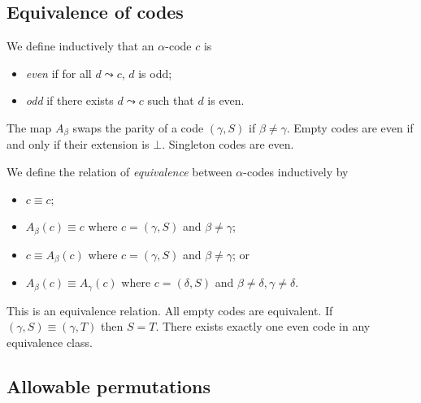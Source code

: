 \documentclass{article}
\begin{document}
\subsection{Equivalence of codes}

\begin{definition}
    We define inductively that an \( \alpha \)-code \( c \) is
    \begin{itemize}
        \item \emph{even} if for all \( d \leadsto c \), \( d \) is odd;
        \item \emph{odd} if there exists \( d \leadsto c \) such that \( d \) is even.
    \end{itemize}
\end{definition}
\begin{lemma}
    The map \( A_\beta \) swaps the parity of a code \( (\gamma, S) \) if \( \beta \neq \gamma \).
    Empty codes are even if and only if their extension is \( \bot \).
    Singleton codes are even.
\end{lemma}
\begin{definition}
    We define the relation of \emph{equivalence} between \( \alpha \)-codes inductively by
    \begin{itemize}
        \item \( c \equiv c \);
        \item \( A_\beta(c) \equiv c \) where \( c = (\gamma, S) \) and \( \beta \neq \gamma \);
        \item \( c \equiv A_\beta(c) \) where \( c = (\gamma, S) \) and \( \beta \neq \gamma \); or
        \item \( A_\beta(c) \equiv A_\gamma(c) \) where \( c = (\delta, S) \) and \( \beta \neq \delta, \gamma \neq \delta \).
    \end{itemize}
\end{definition}
\begin{lemma}
    This is an equivalence relation.
    All empty codes are equivalent.
    If \( (\gamma, S) \equiv (\gamma, T) \) then \( S = T \).
    There exists exactly one even code in any equivalence class.
\end{lemma}

\subsection{Allowable permutations}

\end{document}

